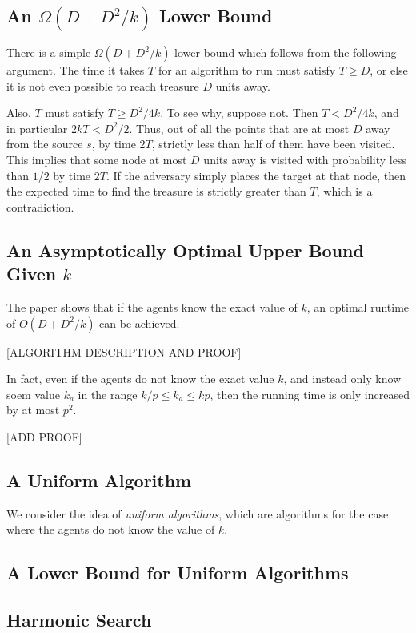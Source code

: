 \documentclass[11pt]{article}
\begin{document}
\subsection{An $\Omega(D+D^2/k)$ Lower Bound}

There is a simple $\Omega(D+D^2/k)$ lower bound which follows from the following argument. The time it takes $T$ for an algorithm to run must satisfy $T \geq D$, or else it is not even possible to reach treasure $D$ units away. 

Also, $T$ must satisfy $T \geq D^2/4k$. To see why, suppose not. Then $T < D^2/4k$, and in particular $2kT < D^2/2$. Thus, out of all the points that are at most $D$ away from the source $s$, by time $2T$, strictly less than half of them have been visited. This implies that some node at most $D$ units away is visited with probability less than $1/2$ by time $2T$. If the adversary simply places the target at that node, then the expected time to find the treasure is strictly greater than $T$, which is a contradiction.

\subsection{An Asymptotically Optimal Upper Bound Given $k$}

The paper shows that if the agents know the exact value of $k$, an optimal runtime of $O(D+D^2/k)$ can be achieved.

[ALGORITHM DESCRIPTION AND PROOF]

In fact, even if the agents do not know the exact value $k$, and instead only know soem value $k_a$ in the range $k/p \leq k_a \leq kp$, then the running time is only increased by at most $p^2$.

[ADD PROOF]

\subsection{A Uniform Algorithm}

We consider the idea of \emph{uniform algorithms}, which are algorithms for the case where the agents do not know the value of $k$. 

\subsection{A Lower Bound for Uniform Algorithms}

\subsection{Harmonic Search}
\end{document}
